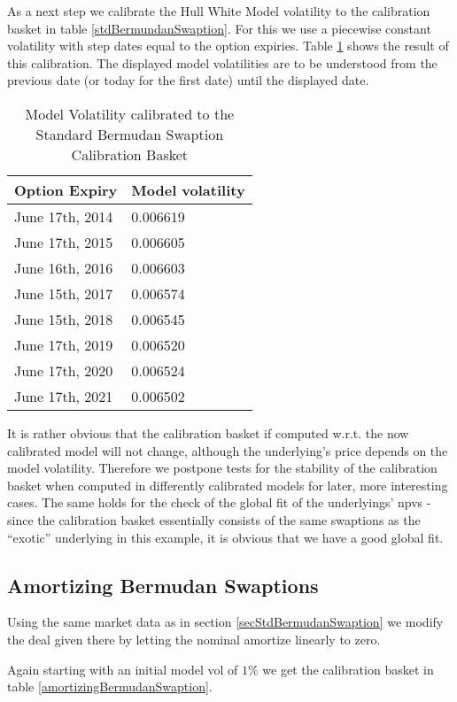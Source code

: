 \documentclass{amsart}
\theoremstyle{plain}
\numberwithin{equation}{section}
\begin{document}
As a next step we calibrate the Hull White Model volatility to the calibration basket in table \ref{stdBermundanSwaption}.
For this we use a piecewise constant volatility with step dates equal to the option expiries. Table \ref{stdBermudanSwaptionModelCal} shows the result of this calibration. The displayed model volatilities are to be understood from the previous date (or today for the first date) until the displayed date.

\begin{table}[ht]
\caption{Model Volatility calibrated to the Standard Bermudan Swaption Calibration Basket}
\begin{tabular}{l | l }
Option Expiry & Model volatility \\ \hline
June 17th, 2014 & 0.006619 \\
June 17th, 2015 & 0.006605 \\
June 16th, 2016 & 0.006603 \\
June 15th, 2017 & 0.006574 \\
June 15th, 2018 & 0.006545 \\
June 17th, 2019 & 0.006520 \\
June 17th, 2020 & 0.006524 \\
June 17th, 2021 & 0.006502
\end{tabular}
\label{stdBermudanSwaptionModelCal}
\end{table}

It is rather obvious that the calibration basket if computed w.r.t. the now calibrated model will not change, although
the underlying's price depends on the model volatility. Therefore we postpone tests for the stability of the calibration basket when computed in differently calibrated models for later, more interesting cases. The same holds for the check of the global fit of the underlyings' npvs - since the calibration basket essentially consists of the same swaptions as the ``exotic'' underlying in this example, it is obvious that we have a good global fit.

\subsection{Amortizing Bermudan Swaptions}
\label{secAmortizingBermudanSwaptions}

Using the same market data as in section \ref{secStdBermudanSwaption} we modify the deal given there by letting the
nominal amortize linearly to zero.

Again starting with an initial model vol of $1\%$ we get the calibration basket in table \ref{amortizingBermudanSwaption}.
\end{document}
